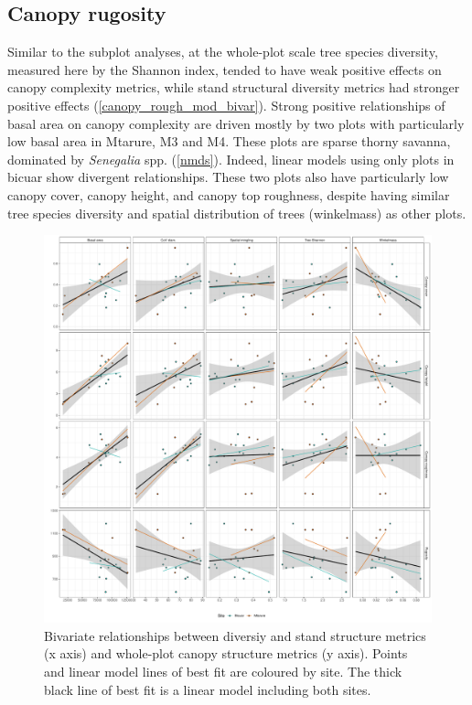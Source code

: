 \documentclass[11pt,a4paper]{article}
\begin{document}


\subsection{Canopy rugosity}

Similar to the subplot analyses, at the whole-plot scale tree species diversity, measured here by the Shannon index, tended to have weak positive effects on canopy complexity metrics, while stand structural diversity metrics had stronger positive effects (\autoref{canopy_rough_mod_bivar}). Strong positive relationships of basal area on canopy complexity are driven mostly by two plots with particularly low basal area in Mtarure, M3 and M4. These plots are sparse thorny savanna, dominated by \textit{Senegalia} spp. (\autoref{nmds}). Indeed, linear models using only plots in bicuar show divergent relationships. These two plots also have particularly low canopy cover, canopy height, and canopy top roughness, despite having similar tree species diversity and spatial distribution of trees (winkelmass) as other plots.

\begin{figure}[H]
\centering
	\includegraphics[width=\textwidth]{canopy_rough_mod_bivar}
	\caption{Bivariate relationships between diversiy and stand structure metrics (x axis) and whole-plot canopy structure metrics (y axis). Points and linear model lines of best fit are coloured by site. The thick black line of best fit is a linear model including both sites.}
	\label{canopy_rough_mod_bivar}
\end{figure}
\end{document}
